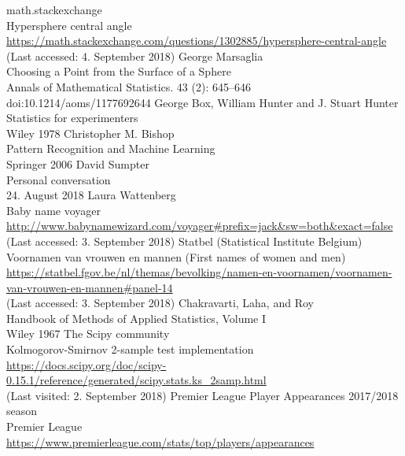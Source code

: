 \documentclass[10pt, a4paper]{UUThesisTemplate}
\begin{document}
\begin{thebibliography}{--}
math.stackexchange\\
	Hypersphere central angle\\
	\url{https://math.stackexchange.com/questions/1302885/hypersphere-central-angle}\\
	(Last accessed: 4. September 2018)
     George Marsaglia\\
    Choosing a Point from the Surface of a Sphere\\
    Annals of Mathematical Statistics. 43 (2): 645–646\\
    doi:10.1214/aoms/1177692644
     George Box, William Hunter and J. Stuart Hunter\\
    Statistics for experimenters\\
    Wiley 1978
     Christopher M. Bishop\\
    Pattern Recognition and Machine Learning\\
    Springer 2006
     David Sumpter\\
    Personal conversation\\
    24. August 2018
     Laura Wattenberg\\
    Baby name voyager\\
    \url{http://www.babynamewizard.com/voyager#prefix=jack&sw=both&exact=false}\\
    (Last accessed: 3. September 2018)    
     Statbel (Statistical Institute Belgium)\\
    Voornamen van vrouwen en mannen (First names of women and men)
    \url{https://statbel.fgov.be/nl/themas/bevolking/namen-en-voornamen/voornamen-van-vrouwen-en-mannen#panel-14}\\
    (Last accessed: 3. September 2018)
     Chakravarti, Laha, and Roy\\
    Handbook of Methods of Applied Statistics, Volume I\\
    Wiley 1967
     The Scipy community\\
    Kolmogorov-Smirnov 2-sample test implementation\\
    \url{https://docs.scipy.org/doc/scipy-0.15.1/reference/generated/scipy.stats.ks_2samp.html}\\
    (Last visited: 2. September 2018)
     Premier League Player Appearances 2017/2018 season\\
    Premier League\\
    \url{https://www.premierleague.com/stats/top/players/appearances}\\

\end{thebibliography}
\end{document}
